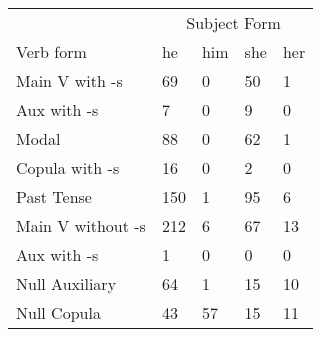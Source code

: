 \begin{table}[]
\begin{minipage}{0.5\textwidth}
\end{minipage}
\begin{minipage}{0.5\textwidth}
    \centering
    \begin{tabular}{@{}lllll@{}}
        \toprule
            &\multicolumn{4}{c}{Subject Form}\\
            \cline{2-5}
        Verb form & he & him & she & her \\
        \midrule
        Main V with -s & 69 & 0 & 50 & 1 \\
        Aux with -s & 7 & 0 & 9 & 0 \\
        Modal & 88 & 0 & 62 & 1 \\
        Copula with -s & 16 & 0 & 2 & 0 \\
        Past Tense & 150 & 1 & 95 & 6 \\
        \hline
        Main V without -s & 212 & 6 & 67 & 13 \\
        Aux with -s & 1 & 0 & 0 & 0 \\
        Null Auxiliary & 64 & 1 & 15 & 10 \\
        Null Copula & 43 & 57 & 15 & 11 \\
        \bottomrule
    \end{tabular}
\end{minipage}
\end{table}
